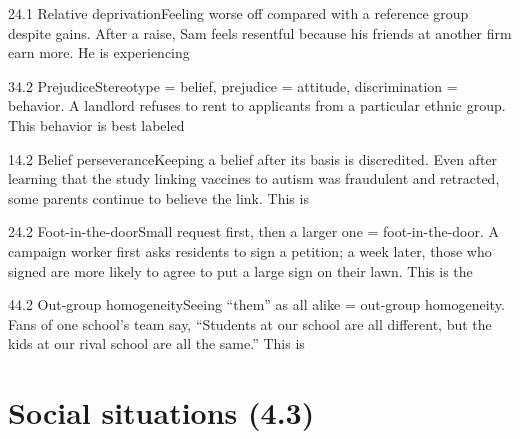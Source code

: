 \documentclass[11pt]{article}
\begin{document}
\begin{q}{2}{4.1 Relative deprivation}{Feeling worse off compared with a reference group despite gains.}
After a raise, Sam feels resentful because his friends at another firm earn more. He is experiencing
\end{q}

\begin{q}{3}{4.2 Prejudice}{Stereotype = belief, prejudice = attitude, discrimination = behavior.}
A landlord refuses to rent to applicants from a particular ethnic group. This behavior is best labeled
\end{q}

\begin{q}{1}{4.2 Belief perseverance}{Keeping a belief after its basis is discredited.}
Even after learning that the study linking vaccines to autism was fraudulent and retracted, some parents continue to believe the link. This is
\end{q}

\begin{q}{2}{4.2 Foot-in-the-door}{Small request first, then a larger one = foot-in-the-door.}
A campaign worker first asks residents to sign a petition; a week later, those who signed are more likely to agree to put a large sign on their lawn. This is the
\end{q}

\begin{q}{4}{4.2 Out-group homogeneity}{Seeing ``them'' as all alike = out-group homogeneity.}
Fans of one school's team say, ``Students at our school are all different, but the kids at our rival school are all the same.'' This is
\end{q}

\section{Social situations (4.3)}
\end{document}
